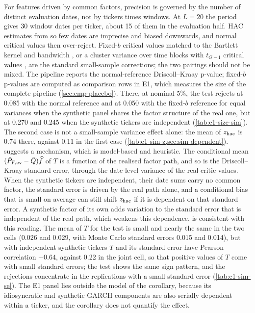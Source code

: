 \begin{remark}\label{rem:small-T}
For features driven by common factors, precision is governed by the number of distinct evaluation
dates, not by tickers times windows. At $L=20$ the \TEST{} period gives 30 window dates per ticker,
about 15 of them in the evaluation half. HAC estimates from so few dates are imprecise and biased
downwards, and normal critical values then over-reject. Fixed-$b$ critical values matched to the
Bartlett kernel and bandwidth \citep{kiefer_2005_new}, or a cluster variance over time blocks with
$t_{G-1}$ critical values \citep{bester_2011_inference}, are the standard small-sample
corrections; the two pairings should not be mixed. The pipeline reports the normal-reference
Driscoll--Kraay p-value; fixed-$b$ p-values are computed as comparison rows in E1, which measures
the size of the complete pipeline (\cref{sec:emp-placebo}). There, at nominal 5\%, the \WC{} test
rejects at 0.085 with the normal reference and at 0.050 with the fixed-$b$ reference for equal
variances when the synthetic panel shares the factor structure of the real one, but at 0.270 and
0.245 when the synthetic tickers are independent (\cref{tab:e1-size-sim}). The second case is not
a small-sample variance effect alone: the mean of $z_{\mathrm{hac}}$ is 0.74 there, against 0.11 in the first
case (\cref{tab:e1-sim-z,sec:sim-dependent}).  suggests a mechanism, which
is model-based and heuristic. The conditional mean $(\hat P_{F,\mathrm{ev}}-\bar Q)\widehat{f}$ of $T$ is a
function of the realised factor path, and so is the Driscoll--Kraay standard error, through the
date-level variance of the real critic values. When the synthetic tickers are independent, their
date sums carry no common factor, the standard error is driven by the real path alone, and a
conditional bias that is small on average can still shift $z_{\mathrm{hac}}$ if it is dependent on that
standard error. A synthetic factor of its own adds variation to the standard error that is
independent of the real path, which weakens this dependence.
 is consistent with this reading. The mean of $T$ for the \WC{} test
is small and nearly the same in the two cells (0.026 and 0.029, with Monte Carlo standard errors
0.015 and 0.014), but with independent synthetic tickers $T$ and its standard error have
Pearson correlation $-0.64$, against 0.22 in the joint cell, so that positive values of $T$ come with
small standard errors; the \LRC{} test shows the same sign pattern, and the rejections concentrate
in the replications with a small standard error (\cref{tab:e1-sim-se}). The E1 panel lies outside the
model of the corollary, because its idiosyncratic and synthetic GARCH components are also
serially dependent within a ticker, and the corollary does not quantify the effect.
\end{remark}

